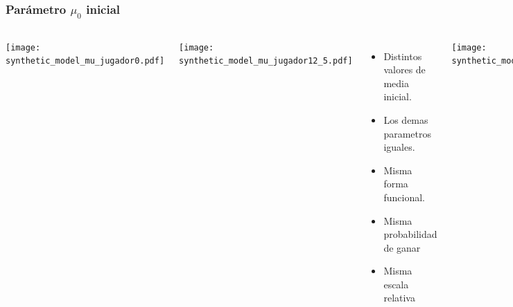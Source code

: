\documentclass{beamer}
\begin{document}
\begin{frame}
\frametitle{Par\'ametro $\mu_0$ inicial}

\begin{columns}
\begin{minipage}[c][0.4\textheight][c]{\linewidth}
  \centering
  \texttt{[image: synthetic\_model\_mu\_jugador0.pdf]}
\end{minipage}
\begin{minipage}[c][0.4\textheight][c]{\linewidth}
  \centering
  \texttt{[image: synthetic\_model\_mu\_jugador12\_5.pdf]}
\end{minipage}
\begin{minipage}[c][0.4\textheight][c]{\linewidth}
  \begin{itemize}
  \item Distintos valores de media inicial. 
  \item Los demas parametros iguales.
  \item Misma forma funcional.
  \item Misma probabilidad de ganar
  \item Misma escala relativa
  \end{itemize}
\end{minipage}
\begin{minipage}[c][0.4\textheight][c]{\linewidth}
  \centering
  \texttt{[image: synthetic\_model\_mu\_jugador25.pdf]}
\end{minipage}
\end{columns}
\end{frame}

\end{document}
